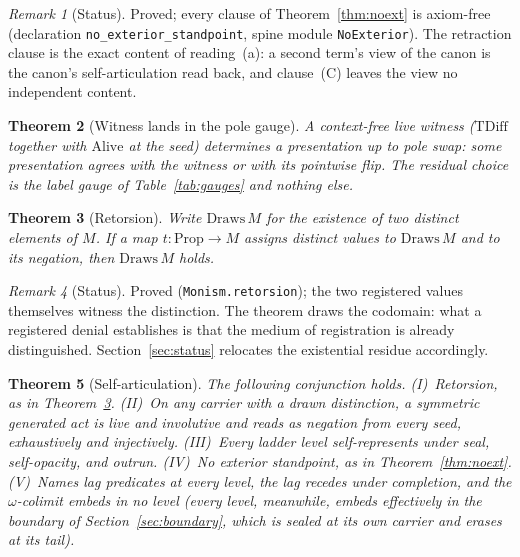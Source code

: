 \documentclass[11pt,a4paper]{article}
\theoremstyle{plain}
\newtheorem{theorem}{Theorem}[section]
\theoremstyle{definition}
\theoremstyle{remark}
\newtheorem{remark}[theorem]{Remark}
\begin{document}
\begin{remark}[Status]
Proved; every clause of Theorem~\ref{thm:noext} is axiom-free
(declaration \texttt{no\_exterior\_standpoint}, spine module
\texttt{NoExterior}). The retraction clause is
the exact content of reading~(a): a second term's view of the canon is
the canon's self-articulation read back, and clause~\textup{(C)} leaves
the view no independent content.
\end{remark}

\begin{theorem}[Witness lands in the pole gauge]
\label{thm:preswit}
A context-free live witness ($\mathrm{TDiff}$ together with
$\mathrm{Alive}$ at the seed) determines a presentation up to pole
swap: some presentation agrees with the witness or with its pointwise
flip. The residual choice is the label gauge of Table~\ref{tab:gauges}
and nothing else.
\end{theorem}

\begin{theorem}[Retorsion]
\label{thm:retorsion}
Write $\mathrm{Draws}\,M$ for the existence of two distinct elements of
$M$. If a map $t:\mathrm{Prop}\to M$ assigns distinct values to
$\mathrm{Draws}\,M$ and to its negation, then $\mathrm{Draws}\,M$
holds.
\end{theorem}

\begin{remark}[Status]
Proved (\texttt{Monism.retorsion}); the two registered values
themselves witness the distinction. The theorem draws the codomain:
what a registered denial establishes is that the medium of registration
is already distinguished. Section~\ref{sec:status} relocates the
existential residue accordingly.
\end{remark}

\begin{theorem}[Self-articulation]
\label{thm:selfart}
The following conjunction holds. \textup{(I)}~Retorsion, as in
Theorem~\ref{thm:retorsion}. \textup{(II)}~On any carrier with a drawn
distinction, a symmetric generated act is live and involutive and reads
as negation from every seed, exhaustively and injectively.
\textup{(III)}~Every ladder level self-represents under seal,
self-opacity, and outrun. \textup{(IV)}~No exterior standpoint, as in
Theorem~\ref{thm:noext}. \textup{(V)}~Names lag predicates at every
level, the lag recedes under completion, and the $\omega$-colimit
embeds in no level (every level, meanwhile, embeds effectively in the
boundary of Section~\ref{sec:boundary}, which is sealed at its own
carrier and erases at its tail).
\end{theorem}
\end{document}
